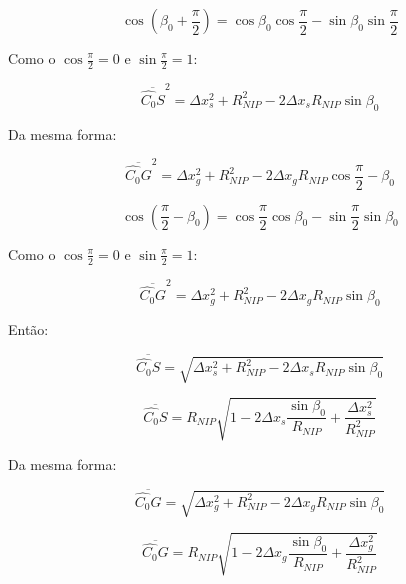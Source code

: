 \documentclass[a4paper, 12pt]{article}
\begin{document}
\begin{equation}
 \label{eq:1.11}
 \cos{\left( \beta_0 + \frac{\pi}{2} \right)} 
 = \cos{\beta_0} \cos{\frac{\pi}{2}} - \sin{\beta_0} \sin{\frac{\pi}{2}}
\end{equation}

Como o $\cos{\frac{\pi}{2}}=0$ e $\sin{\frac{\pi}{2}}=1$:

\begin{equation}
 \label{eq:1.12}
 \overline{\hat{C_0}S}^2 = \Delta x_{s}^2 + R_{NIP}^2 - 2 \Delta x_s R_{NIP} \sin{\beta_0}
\end{equation}

Da mesma forma:

\begin{equation}
 \label{eq:1.13}
 \overline{\hat{C_0}G}^2 = \Delta x_{g}^2 + R_{NIP}^2 - 2 \Delta x_g R_{NIP} \cos{\frac{\pi}{2} - \beta_0}
\end{equation}

\begin{equation}
 \label{eq:1.14}
 \cos{\left( \frac{\pi}{2} - \beta_0 \right)} 
 = \cos{\frac{\pi}{2}} \cos{\beta_0} - \sin{\frac{\pi}{2}} \sin{\beta_0}
\end{equation}

Como o $\cos{\frac{\pi}{2}}=0$ e $\sin{\frac{\pi}{2}}=1$:

\begin{equation}
 \label{eq:1.15}
 \overline{\hat{C_0}G}^2 = \Delta x_{g}^2 + R_{NIP}^2 - 2 \Delta x_g R_{NIP} \sin{\beta_0}
\end{equation}

Então:

\begin{equation}
 \label{eq:1.16}
 \overline{\hat{C_0}S} = \sqrt{ \Delta x_{s}^2 + R_{NIP}^2 - 2 \Delta x_s R_{NIP} \sin{\beta_0} }
\end{equation}

\begin{equation}
 \label{eq:1.17}
 \overline{\hat{C_0}S} = 
 R_{NIP} \sqrt{  1 - 2 \Delta x_s \frac{\sin{\beta_0}}{R_{NIP}} + \frac{\Delta x_{s}^2}{R_{NIP}^2} }
\end{equation}

Da mesma forma:

\begin{equation}
 \label{eq:1.18}
 \overline{\hat{C_0}G} = \sqrt{ \Delta x_{g}^2 + R_{NIP}^2 - 2 \Delta x_g R_{NIP} \sin{\beta_0} }
\end{equation}

\begin{equation}
 \label{eq:1.19}
 \overline{\hat{C_0}G} = 
 R_{NIP} \sqrt{  1 - 2 \Delta x_g \frac{\sin{\beta_0}}{R_{NIP}} + \frac{\Delta x_{g}^2}{R_{NIP}^2} }
\end{equation}
\end{document}
